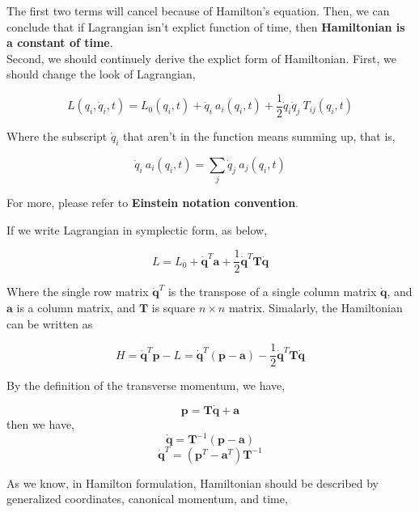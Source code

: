\documentclass[12pt]{article}
\begin{document}
The first two terms will cancel because of Hamilton's equation.
Then, we can conclude that if Lagrangian isn't explict function of time, then \textbf{Hamiltonian is a constant of time}.
\\
\indent Second, we should continuely derive the explict form of Hamiltonian. First, we should change the look of Lagrangian,

\begin{center}
    \[ L(q_i, \dot{q}_i, t) = L_0(q_i,t) + \dot{q}_i\ a_i(q_i, t) + \frac{1}{2}\dot{q}_i\dot{q}_j\ T_{ij}(q_i, t) \]
\end{center}

Where the subscript $\dot{q}_i$ that aren't in the function means summing up, that is,

\begin{center}
    \[ \dot{q}_i\ a_i(q_i, t) = \sum_{j}{\dot{q}_j\ a_j(q_i, t)} \]
\end{center}

For more, please refer to \textbf{Einstein notation convention}.

If we write Lagrangian in symplectic form, as below,

\begin{center}
    \[ L = L_0 + \mathbf{\dot{q}}^T \mathbf{a} + \frac{1}{2}\mathbf{\dot{q}}^T \mathbf{T} \mathbf{\dot{q}} \]
\end{center}

Where the single row matrix $\mathbf{\dot{q}}^T$ is the transpose of a single column matrix $\mathbf{\dot{q}}$, and $\mathbf{a}$ is a column matrix, and $\mathbf{T}$ is square $n \times n$ matrix.
Simalarly, the Hamiltonian can be written as 

\begin{center}
    \[ H = \mathbf{\dot{q}}^T\mathbf{p} - L = \mathbf{\dot{q}}^T(\mathbf{p} - \mathbf{a}) - \frac{1}{2}\mathbf{\dot{q}}^T\mathbf{T}\mathbf{\dot{q}} \]
\end{center}

By the definition of the transverse momentum, we have,

\begin{center}
    \[ \mathbf{p} = \mathbf{T\dot{q}} + \mathbf{a} \]
    then we have,
    \[ \mathbf{\dot{q}} = \mathbf{T}^{-1}(\mathbf{p-a}) \]
    \[ \mathbf{\dot{q}}^T = (\mathbf{p}^T - \mathbf{a}^T)\mathbf{T}^{-1} \]
\end{center}

As we know, in Hamilton formulation, Hamiltonian should be described by generalized coordinates, canonical momentum, and time,
\end{document}
